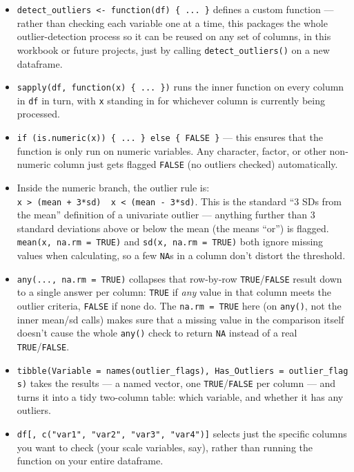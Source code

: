 \documentclass[
  letterpaper,
  DIV=11,
  numbers=noendperiod]{scrreprt}
\begin{document}
\begin{itemize}
\item
  \texttt{detect\_outliers\ \textless{}-\ function(df)\ \{\ ...\ \}}
  defines a custom function --- rather than checking each variable one
  at a time, this packages the whole outlier-detection process so it can
  be reused on any set of columns, in this workbook or future projects,
  just by calling \texttt{detect\_outliers()} on a new dataframe.
\item
  \texttt{sapply(df,\ function(x)\ \{\ ...\ \})} runs the inner function
  on every column in \texttt{df} in turn, with \texttt{x} standing in
  for whichever column is currently being processed.
\item
  \texttt{if\ (is.numeric(x))\ \{\ ...\ \}\ else\ \{\ FALSE\ \}} ---
  this ensures that the function is only run on numeric variables. Any
  character, factor, or other non-numeric column just gets flagged
  \texttt{FALSE} (no outliers checked) automatically.
\item
  Inside the numeric branch, the outlier rule is:
  \texttt{x\ \textgreater{}\ (mean\ +\ 3*sd)\ \textbar{}\ x\ \textless{}\ (mean\ -\ 3*sd)}.
  This is the standard ``3 SDs from the mean'' definition of a
  univariate outlier --- anything further than 3 standard deviations
  above or below the mean (the \texttt{\textbar{}} means ``or'') is
  flagged. \texttt{mean(x,\ na.rm\ =\ TRUE)} and
  \texttt{sd(x,\ na.rm\ =\ TRUE)} both ignore missing values when
  calculating, so a few \texttt{NA}s in a column don't distort the
  threshold.
\item
  \texttt{any(...,\ na.rm\ =\ TRUE)} collapses that row-by-row
  \texttt{TRUE}/\texttt{FALSE} result down to a single answer per
  column: \texttt{TRUE} if \emph{any} value in that column meets the
  outlier criteria, \texttt{FALSE} if none do. The
  \texttt{na.rm\ =\ TRUE} here (on \texttt{any()}, not the inner mean/sd
  calls) makes sure that a missing value in the comparison itself
  doesn't cause the whole \texttt{any()} check to return \texttt{NA}
  instead of a real \texttt{TRUE}/\texttt{FALSE}.
\item
  \texttt{tibble(Variable\ =\ names(outlier\_flags),\ Has\_Outliers\ =\ outlier\_flags)}
  takes the results --- a named vector, one \texttt{TRUE}/\texttt{FALSE}
  per column --- and turns it into a tidy two-column table: which
  variable, and whether it has any outliers.
\item
  \texttt{df{[},\ c("var1",\ "var2",\ "var3",\ "var4"){]}} selects just
  the specific columns you want to check (your scale variables, say),
  rather than running the function on your entire dataframe.
\end{itemize}
\end{document}
